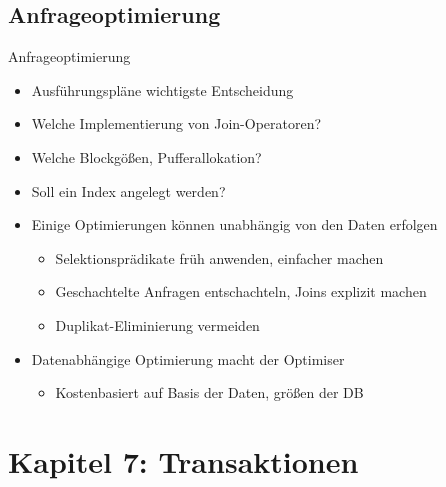 \documentclass{article}
\begin{document}
\subsection*{Anfrageoptimierung}

\begin{block}{Anfrageoptimierung}
  \begin{itemize}
    \item Ausführungspläne wichtigste Entscheidung
    \item Welche Implementierung von Join-Operatoren?
    \item Welche Blockgößen, Pufferallokation?
    \item Soll ein Index angelegt werden?
    \item Einige Optimierungen können unabhängig von den Daten erfolgen
    \begin{itemize}
      \item Selektionsprädikate früh anwenden, einfacher machen
      \item Geschachtelte Anfragen entschachteln, Joins explizit machen
      \item Duplikat-Eliminierung vermeiden
    \end{itemize}
    \item Datenabhängige Optimierung macht der Optimiser
    \begin{itemize}
      \item Kostenbasiert auf Basis der Daten, größen der DB
    \end{itemize}
  \end{itemize}
\end{block}

\section{Kapitel 7: Transaktionen}
\end{document}
